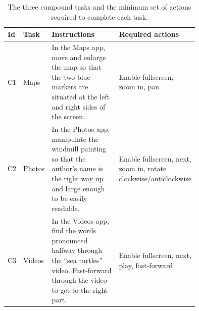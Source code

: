 \begin{table}[tb]
    \footnotesize
    \renewcommand{\arraystretch}{1.1}
    \captionsetup{justification=centering}
    \begin{tabular}{llp{0.5\linewidth}p{0.25\linewidth}}
        \toprule
        \textbf{Id} & \textbf{Task} & \textbf{Instructions} & \textbf{Required actions}\\
        \midrule
        C1 & Maps & In the Maps app, move and enlarge the map so that the two blue markers are situated at the left and right sides of the screen. & Enable fullscreen, zoom in, pan  \\
        C2 & Photos & In the Photos app, manipulate the windmill painting so that the author's name is the right way up and large enough to be easily readable. & Enable fullscreen, next, zoom in, rotate clockwise\slash anticlockwise \\
        C3 & Videos & In the Videos app, find the words pronounced halfway through the ``sea turtles'' video. Fast-forward through the video to get to the right part. & Enable fullscreen, next, play, fast-forward \\
        \bottomrule
    \end{tabular}
    \vspace{-4pt}
    \caption{The three compound tasks and the minimum set of actions required to complete each task.}
    \label{tab:lui:tasks-compound}
\end{table}

